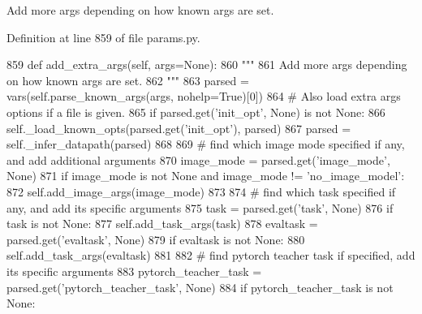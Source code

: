 \begin{DoxyVerb}Add more args depending on how known args are set.
\end{DoxyVerb}
 

Definition at line 859 of file params.\+py.


\begin{DoxyCode}
859     \textcolor{keyword}{def }add\_extra\_args(self, args=None):
860         \textcolor{stringliteral}{"""}
861 \textcolor{stringliteral}{        Add more args depending on how known args are set.}
862 \textcolor{stringliteral}{        """}
863         parsed = vars(self.parse\_known\_args(args, nohelp=\textcolor{keyword}{True})[0])
864         \textcolor{comment}{# Also load extra args options if a file is given.}
865         \textcolor{keywordflow}{if} parsed.get(\textcolor{stringliteral}{'init\_opt'}, \textcolor{keywordtype}{None}) \textcolor{keywordflow}{is} \textcolor{keywordflow}{not} \textcolor{keywordtype}{None}:
866             self.\_load\_known\_opts(parsed.get(\textcolor{stringliteral}{'init\_opt'}), parsed)
867         parsed = self.\_infer\_datapath(parsed)
868 
869         \textcolor{comment}{# find which image mode specified if any, and add additional arguments}
870         image\_mode = parsed.get(\textcolor{stringliteral}{'image\_mode'}, \textcolor{keywordtype}{None})
871         \textcolor{keywordflow}{if} image\_mode \textcolor{keywordflow}{is} \textcolor{keywordflow}{not} \textcolor{keywordtype}{None} \textcolor{keywordflow}{and} image\_mode != \textcolor{stringliteral}{'no\_image\_model'}:
872             self.add\_image\_args(image\_mode)
873 
874         \textcolor{comment}{# find which task specified if any, and add its specific arguments}
875         task = parsed.get(\textcolor{stringliteral}{'task'}, \textcolor{keywordtype}{None})
876         \textcolor{keywordflow}{if} task \textcolor{keywordflow}{is} \textcolor{keywordflow}{not} \textcolor{keywordtype}{None}:
877             self.add\_task\_args(task)
878         evaltask = parsed.get(\textcolor{stringliteral}{'evaltask'}, \textcolor{keywordtype}{None})
879         \textcolor{keywordflow}{if} evaltask \textcolor{keywordflow}{is} \textcolor{keywordflow}{not} \textcolor{keywordtype}{None}:
880             self.add\_task\_args(evaltask)
881 
882         \textcolor{comment}{# find pytorch teacher task if specified, add its specific arguments}
883         pytorch\_teacher\_task = parsed.get(\textcolor{stringliteral}{'pytorch\_teacher\_task'}, \textcolor{keywordtype}{None})
884         \textcolor{keywordflow}{if} pytorch\_teacher\_task \textcolor{keywordflow}{is} \textcolor{keywordflow}{not} \textcolor{keywordtype}{None}:

\end{DoxyCode}
